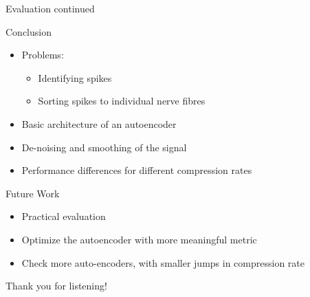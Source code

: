 \documentclass{beamer}
\begin{document}
\begin{frame}{Evaluation continued}
{\begin{minipage}[t]{0.5\textwidth}
\begin{figure}
		\end{figure}
\end{minipage}}
\end{frame}

\begin{frame}{Conclusion}
	\begin{itemize}
		    \item<1-> Problems:  \begin{itemize}
		    	\item Identifying spikes
		    	\item Sorting spikes to individual nerve fibres
		    \end{itemize}
	     	\item<2-> Basic architecture of an autoencoder
	     	\item<3-> De-noising and smoothing of the signal 
	     	\item<4-> Performance differences for different compression rates

	\end{itemize}
\end{frame}

\begin{frame}{Future Work}
	\begin{itemize}
		\item<0-> Practical evaluation
		\item<1-> Optimize the autoencoder with more meaningful metric
		\item<2-> Check more auto-encoders, with smaller jumps in compression rate
	\end{itemize}
\end{frame}

\begin{frame}
    \begin{center}
        Thank you for listening!
    \end{center}
\end{frame}
\end{document}
